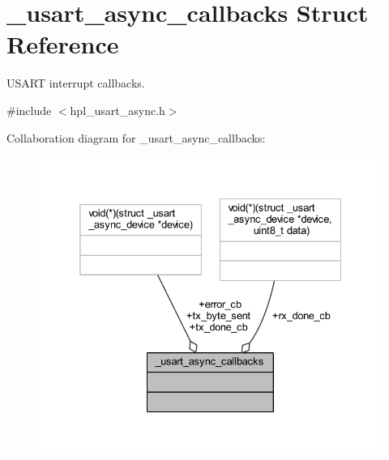 \hypertarget{struct__usart__async__callbacks}{}\section{\+\_\+usart\+\_\+async\+\_\+callbacks Struct Reference}
\label{struct__usart__async__callbacks}


U\+S\+A\+RT interrupt callbacks.  




{\ttfamily \#include $<$hpl\+\_\+usart\+\_\+async.\+h$>$}



Collaboration diagram for \+\_\+usart\+\_\+async\+\_\+callbacks\+:
\nopagebreak
\begin{figure}[H]
\begin{center}
\leavevmode
\includegraphics[width=332pt]{struct__usart__async__callbacks__coll__graph}
\end{center}
\end{figure}
